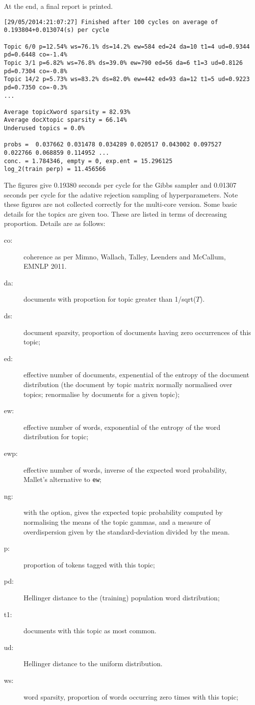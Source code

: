 \documentclass[a4paper,english]{article}
\begin{document}
At the end, a final report is printed.  
\begin{verbatim}
[29/05/2014:21:07:27] Finished after 100 cycles on average of 0.193804+0.013074(s) per cycle

Topic 6/0 p=12.54% ws=76.1% ds=14.2% ew=584 ed=24 da=10 t1=4 ud=0.9344 pd=0.6448 co=-1.4%
Topic 3/1 p=6.82% ws=76.8% ds=39.0% ew=790 ed=56 da=6 t1=3 ud=0.8126 pd=0.7304 co=-0.8%
Topic 14/2 p=5.73% ws=83.2% ds=82.0% ew=442 ed=93 da=12 t1=5 ud=0.9223 pd=0.7350 co=-0.3%
...

Average topicXword sparsity = 82.93%
Average docXtopic sparsity = 66.14%
Underused topics = 0.0%

probs =  0.037662 0.031478 0.034289 0.020517 0.043002 0.097527 0.022766 0.068859 0.114952 ...
conc. = 1.784346, empty = 0, exp.ent = 15.296125
log_2(train perp) = 11.456566
\end{verbatim}
The figures give 0.19380 seconds per cycle for the Gibbs sampler
and 0.01307 seconds per cycle for the adative rejection sampling
of hyperparameters.  Note these figures are not collected
correctly for the multi-core version.
Some basic details for the topics are given too.
These are listed in terms of decreasing proportion.
Details are as follows:
\begin{description}
\item[co:] coherence as per Mimno, Wallach, Talley, Leenders and McCallum, EMNLP 2011.
\item[da:] documents with proportion for topic greater than 1/sqrt($T$).
\item[ds:] document sparsity, proportion of documents having zero occurrences of this topic;
\item[ed:] effective number of documents, expenential of the entropy of the document distribution (the document by topic matrix normally
normalised over topics; renormalise by documents for a given topic);
\item[ew:] effective number of words, exponential of the entropy of the word distribution for topic;
\item[ewp:] effective number of words, inverse of the expected word probability, Mallet's alternative to \texttt{ew};
\item[ng:] with the  option, gives the expected topic probability computed by normalising the means of the topic gammas,
and a measure of overdispersion given by
the standard-deviation divided by the mean.
\item[p:] proportion of tokens tagged with this topic;
\item[pd:] Hellinger distance to the (training) population word distribution;
\item[t1:] documents with this topic as most common.
\item[ud:] Hellinger distance to the uniform distribution.
\item[ws:] word sparsity, proportion of words occurring zero times with this topic;
\end{description}
\end{document}
